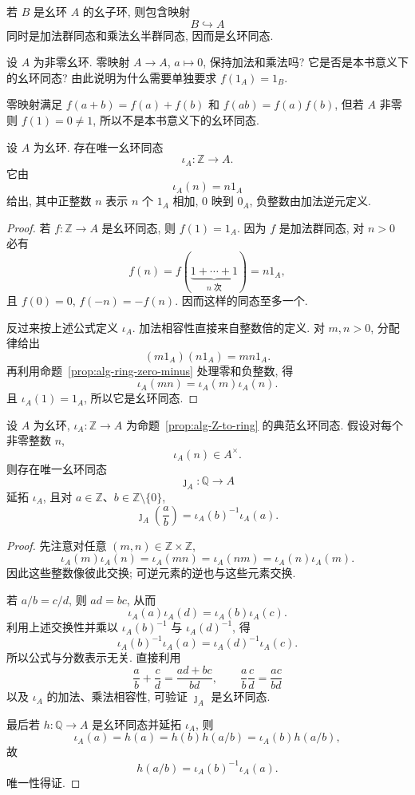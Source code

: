 \documentclass[usesamecnt, thmcnt=section, lang=cn, newtx, 10pt, scheme=chinese]{elegantbook}
\begin{document}
\begin{instance}
若 $B$ 是幺环 $A$ 的幺子环, 则包含映射
\[
 B\hookrightarrow A
\]
同时是加法群同态和乘法幺半群同态, 因而是幺环同态.
\end{instance}

\begin{concept}\label{con:alg-ring-hom-01}
设 $A$ 为非零幺环. 零映射 $A\to A$, $a\mapsto0$, 保持加法和乘法吗? 它是否是本书意义下的幺环同态? 由此说明为什么需要单独要求 $f(1_A)=1_B$.
\end{concept}

\begin{solution}
零映射满足 $f(a+b)=f(a)+f(b)$ 和 $f(ab)=f(a)f(b)$, 但若 $A$ 非零则 $f(1)=0\neq1$, 所以不是本书意义下的幺环同态.
\end{solution}

\begin{proposition}\label{prop:alg-Z-to-ring}
设 $A$ 为幺环. 存在唯一幺环同态
\[
 \iota_A:\mathbb Z\longrightarrow A.
\]
它由
\[
 \iota_A(n)=n1_A
\]
给出, 其中正整数 $n$ 表示 $n$ 个 $1_A$ 相加, $0$ 映到 $0_A$, 负整数由加法逆元定义.
\end{proposition}

\begin{proof}
若 $f:\mathbb Z\to A$ 是幺环同态, 则 $f(1)=1_A$. 因为 $f$ 是加法群同态, 对 $n>0$ 必有
\[
 f(n)=f(\underbrace{1+\cdots+1}_{n\text{ 次}})=n1_A,
\]
且 $f(0)=0$, $f(-n)=-f(n)$. 因而这样的同态至多一个.

反过来按上述公式定义 $\iota_A$. 加法相容性直接来自整数倍的定义. 对 $m,n>0$, 分配律给出
\[
 (m1_A)(n1_A)=mn1_A.
\]
再利用命题~\ref{prop:alg-ring-zero-minus} 处理零和负整数, 得
\[
 \iota_A(mn)=\iota_A(m)\iota_A(n).
\]
且 $\iota_A(1)=1_A$, 所以它是幺环同态.
\end{proof}

\begin{proposition}\label{prop:alg-Q-to-ring}
设 $A$ 为幺环, $\iota_A:\mathbb Z\to A$ 为命题~\ref{prop:alg-Z-to-ring} 的典范幺环同态. 假设对每个非零整数 $n$,
\[
 \iota_A(n)\in A^\times.
\]
则存在唯一幺环同态
\[
 \jmath_A:\mathbb Q\longrightarrow A
\]
延拓 $\iota_A$, 且对 $a\in\mathbb Z$、$b\in\mathbb Z\setminus\{0\}$,
\[
 \jmath_A\left(\frac ab\right)
 =\iota_A(b)^{-1}\iota_A(a).
\]
\end{proposition}

\begin{proof}
先注意对任意 $(m,n)\in\mathbb Z\times\mathbb Z$,
\[
 \iota_A(m)\iota_A(n)=\iota_A(mn)=\iota_A(nm)=\iota_A(n)\iota_A(m).
\]
因此这些整数像彼此交换; 可逆元素的逆也与这些元素交换.

若 $a/b=c/d$, 则 $ad=bc$, 从而
\[
 \iota_A(a)\iota_A(d)=\iota_A(b)\iota_A(c).
\]
利用上述交换性并乘以 $\iota_A(b)^{-1}$ 与 $\iota_A(d)^{-1}$, 得
\[
 \iota_A(b)^{-1}\iota_A(a)
 =\iota_A(d)^{-1}\iota_A(c).
\]
所以公式与分数表示无关. 直接利用
\[
 \frac ab+\frac cd=\frac{ad+bc}{bd},
 \qquad
 \frac ab\frac cd=\frac{ac}{bd}
\]
以及 $\iota_A$ 的加法、乘法相容性, 可验证 $\jmath_A$ 是幺环同态.

最后若 $h:\mathbb Q\to A$ 是幺环同态并延拓 $\iota_A$, 则
\[
 \iota_A(a)=h(a)=h(b)h(a/b)=\iota_A(b)h(a/b),
\]
故
\[
 h(a/b)=\iota_A(b)^{-1}\iota_A(a).
\]
唯一性得证.
\end{proof}
\end{document}
